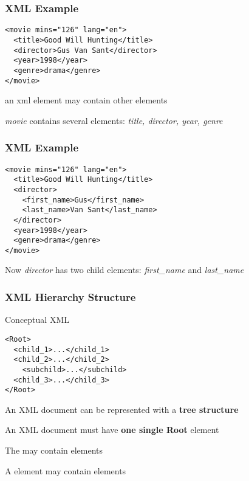 \documentclass[12pt]{beamer}\usepackage[]{graphicx}\usepackage[]{color}
\begin{document}

\begin{frame}[fragile]
\frametitle{XML Example}

\begin{verbatim}
<movie mins="126" lang="en">
  <title>Good Will Hunting</title>
  <director>Gus Van Sant</director>
  <year>1998</year>
  <genre>drama</genre>
</movie>
\end{verbatim}
\eb

\bigskip

\bi
 \item an xml element may contain other elements
 \item \textit{movie} contains several elements: \textit{title, director, year, genre}
\ei

\end{frame}


\begin{frame}[fragile]
\frametitle{XML Example}

\begin{verbatim}
<movie mins="126" lang="en">
  <title>Good Will Hunting</title>
  <director>
    <first_name>Gus</first_name>
    <last_name>Van Sant</last_name>
  </director>
  <year>1998</year>
  <genre>drama</genre>
</movie>
\end{verbatim}
\eb

\bigskip

\bi
 \item Now \textit{director} has two child elements: \textit{first\_name} and \textit{last\_name}
\ei

\end{frame}


\begin{frame}[fragile]
\frametitle{XML Hierarchy Structure}

\begin{block}{Conceptual XML}
\begin{verbatim}
<Root>
  <child_1>...</child_1>
  <child_2>...</child_2>
    <subchild>...</subchild>
  <child_3>...</child_3>
</Root>
\end{verbatim}
\end{block}

\bigskip

\bi
 \item An XML document can be represented with a \textbf{tree structure}
 \item An XML document must have \textbf{one single Root} element
 \item The  may contain  elements
 \item A  element may contain  elements
\ei

\end{frame}
\end{document}
